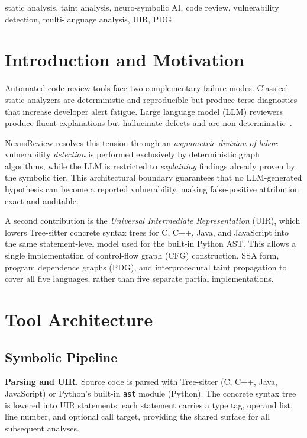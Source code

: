 \documentclass[10pt,conference]{IEEEtran}
\begin{document}
\begin{IEEEkeywords}
static analysis, taint analysis, neuro-symbolic AI, code review,
vulnerability detection, multi-language analysis, UIR, PDG
\end{IEEEkeywords}

\section{Introduction and Motivation}

Automated code review tools face two complementary failure modes.
Classical static analyzers are deterministic and reproducible but
produce terse diagnostics that increase developer alert fatigue.
Large language model (LLM) reviewers produce fluent explanations but
hallucinate defects and are non-deterministic~\cite{deputydev}.

NexusReview resolves this tension through an \emph{asymmetric division
of labor}: vulnerability \emph{detection} is performed exclusively by
deterministic graph algorithms, while the LLM is restricted to
\emph{explaining} findings already proven by the symbolic tier. This
architectural boundary guarantees that no LLM-generated hypothesis can
become a reported vulnerability, making false-positive attribution exact
and auditable.

A second contribution is the \emph{Universal Intermediate
Representation} (UIR), which lowers Tree-sitter concrete syntax trees
for C, C++, Java, and JavaScript into the same statement-level model
used for the built-in Python AST. This allows a single implementation
of control-flow graph (CFG) construction, SSA form, program dependence
graphs (PDG), and interprocedural taint propagation to cover all five
languages, rather than five separate partial implementations.

\section{Tool Architecture}

\subsection{Symbolic Pipeline}

\textbf{Parsing and UIR.} Source code is parsed with Tree-sitter (C,
C++, Java, JavaScript) or Python's built-in \texttt{ast} module
(Python). The concrete syntax tree is lowered into UIR statements: each
statement carries a type tag, operand list, line number, and optional
call target, providing the shared surface for all subsequent analyses.
\end{document}
